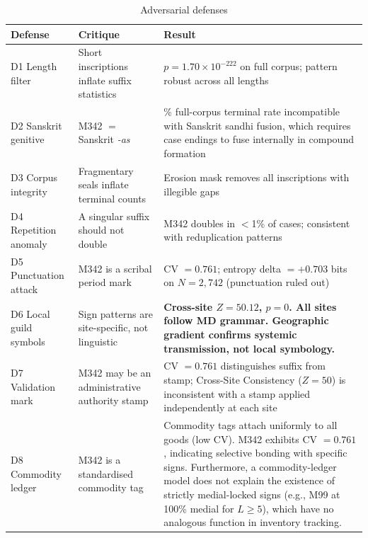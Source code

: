 \documentclass[12pt,letterpaper]{article}
\begin{document}
\begin{table}[htbp]
\centering
\caption{Adversarial defenses}
\label{tab:adversarial}
\begin{tabularx}{\textwidth}{l>{\raggedright\arraybackslash}X>{\raggedright\arraybackslash}X}
\toprule
Defense & Critique & Result \\
\midrule
D1 Length filter &
Short inscriptions inflate suffix statistics &
$p = 1.70 \times 10^{-222}$ on full corpus; pattern robust across all lengths \\
\addlinespace
D2 Sanskrit genitive &
M342 $=$ Sanskrit \textit{-as} &
68\% full-corpus terminal rate incompatible with Sanskrit sandhi fusion, which requires case endings to fuse internally in compound formation \\
\addlinespace
D3 Corpus integrity &
Fragmentary seals inflate terminal counts &
Erosion mask removes all inscriptions with illegible gaps \\
\addlinespace
D4 Repetition anomaly &
A singular suffix should not double &
M342 doubles in $<$1\% of cases; consistent with reduplication patterns \\
\addlinespace
D5 Punctuation attack &
M342 is a scribal period mark &
CV $= 0.761$; entropy delta $= +0.703$ bits on $N = 2{,}742$ (punctuation ruled out) \\
\addlinespace
D6 Local guild symbols &
Sign patterns are site-specific, not linguistic &
\textbf{Cross-site $Z = 50.12$, $p = 0$. All sites follow MD grammar.
Geographic gradient confirms systemic transmission, not local symbology.} \\
\addlinespace
D7 Validation mark &
M342 may be an administrative authority stamp &
CV $= 0.761$ distinguishes suffix from stamp; Cross-Site Consistency
($Z = 50$) is inconsistent with a stamp applied independently at each site \\
\addlinespace
D8 Commodity ledger &
M342 is a standardised commodity tag &
Commodity tags attach uniformly to all goods (low CV).
M342 exhibits CV $= 0.761$, indicating selective bonding with specific signs.
Furthermore, a commodity-ledger model does not explain the existence of strictly
medial-locked signs (e.g., M99 at 100\% medial for $L \geq 5$), which have no
analogous function in inventory tracking. \\
\bottomrule
\end{tabularx}
\end{table}

\end{document}
